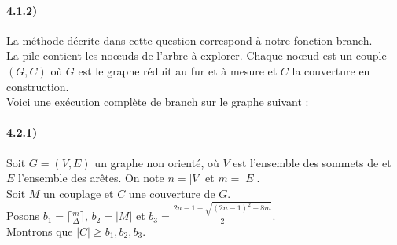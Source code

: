 \documentclass[12pt]{article}
\begin{document}
    \paragraph{4.1.2)}
        La méthode décrite dans cette question correspond à notre fonction branch. \\
        La pile contient les noœuds de l'arbre à explorer. Chaque noœud est un couple $(G,C)$ où $G$ est le graphe réduit au fur et à mesure et $C$ la couverture en construction. \\
        Voici une exécution complète de branch sur le graphe suivant :

    \paragraph{4.2.1)}
        Soit $G=(V,E)$ un graphe non orienté, où $V$ est l'ensemble des sommets de et $E$ l'ensemble des arêtes. On note $n = |V|$ et $m = |E|$. \\
        Soit $M$ un couplage et $C$ une couverture de $G$. \\
        Posons $b_1 = \lceil \frac{m}{\Delta} \rceil$, $b_2 = |M|$ et $b_3 = \frac{2n-1 - \sqrt{(2n-1)^2 - 8m}}{2}$. \\
        Montrons que $|C| \geq b_1,b_2,b_3$.
\end{document}
